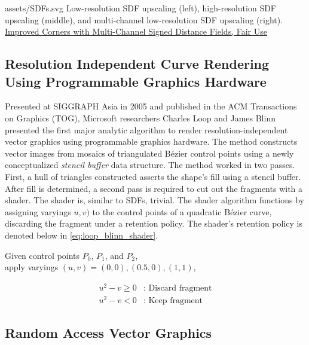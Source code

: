\widesvg
{assets/SDFs.svg}
{Low-resolution SDF upscaling (left), high-resolution SDF upscaling (middle), and multi-channel low-resolution SDF upscaling (right).\label{fig:sdf}}
{\href{https://doi.org/10.1111/cgf.13265}{Improved Corners with Multi-Channel Signed Distance Fields, Fair Use}}
\medskip

\subsection{Resolution Independent Curve Rendering Using Programmable Graphics Hardware}\cite{Loop05}\label{sec:LoopBlinn}

Presented at SIGGRAPH Asia in 2005 and published in the ACM Transactions on Graphics (TOG), Microsoft researchers Charles Loop and James Blinn presented the first major analytic algorithm to render resolution-independent vector graphics using programmable graphics hardware. The method constructs vector images from mosaics of triangulated Bézier control points using a newly conceptualized \emph{stencil buffer} data structure. The method worked in two passes. First, a hull of triangles constructed asserts the shape's fill using a stencil buffer. After fill is determined, a second pass is required to cut out the fragments with a shader. The shader is, similar to SDFs, trivial. The shader algorithm functions by assigning varyings \(u, v)\) to the control points of a quadratic Bézier curve, discarding the fragment under a retention policy. The shader's retention policy is denoted below in \cref{eq:loop_blinn_shader}.\medskip

\begin{center}
Given control points \(P_0\), \(P_1\), and \(P_2\),\\
apply varyings \((u, v) = (0, 0), (0.5, 0), (1, 1)\),
\end{center}
\begin{equation}\label{eq:loop_blinn_shader}
    \begin{split}
        u^2 - v \ge 0 & \text{: Discard fragment} \\
        u^2 - v < 0 & \text{: Keep fragment}
    \end{split}
\end{equation}
\medskip


\subsection{Random Access Vector Graphics}\cite{Nehab08}\label{sec:RAVG}

